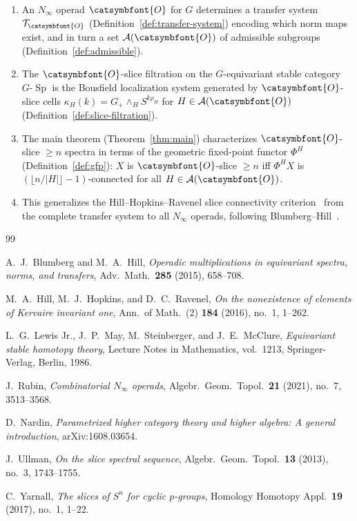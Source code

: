 \documentclass[12pt]{article}
\newcommand{\aO}{{\catsymbfont{O}}}
\newcommand{\aT}{{\mathcal{T}}}
\DeclareMathOperator{\Sp}{Sp}
\newcommand{\SpG}{G\text{-}\Sp}
\theoremstyle{definition}
\begin{document}
\begin{enumerate}
\item An $N_\infty$ operad $\aO$ for $G$ determines a transfer system $\aT_\aO$ (Definition~\ref{def:transfer-system}) encoding which norm maps exist, and in turn a set $\mathcal{A}(\aO)$ of admissible subgroups (Definition~\ref{def:admissible}).

\item The $\aO$-slice filtration on the $G$-equivariant stable category $\SpG$ is the Bousfield localization system generated by $\aO$-slice cells $\kappa_H(k) = G_+\wedge_H S^{k\rho_H}$ for $H\in\mathcal{A}(\aO)$ (Definition~\ref{def:slice-filtration}).

\item The main theorem (Theorem~\ref{thm:main}) characterizes $\aO$-slice $\geq n$ spectra in terms of the geometric fixed-point functor $\Phi^H$ (Definition~\ref{def:gfp}): $X$ is $\aO$-slice $\geq n$ iff $\Phi^H X$ is $(\lfloor n/|H|\rfloor - 1)$-connected for all $H\in\mathcal{A}(\aO)$.

\item This generalizes the Hill--Hopkins--Ravenel slice connectivity criterion~\cite[Prop.~4.28]{HHR} from the complete transfer system to all $N_\infty$ operads, following Blumberg--Hill~\cite{BlumbergHill}.
\end{enumerate}

\begin{thebibliography}{99}

   A.\ J.\ Blumberg and M.\ A.\ Hill,
   \emph{Operadic multiplications in equivariant spectra, norms, and transfers},
   Adv.\ Math.\ \textbf{285} (2015), 658--708.

   M.\ A.\ Hill, M.\ J.\ Hopkins, and D.\ C.\ Ravenel,
   \emph{On the nonexistence of elements of Kervaire invariant one},
   Ann.\ of Math.\ (2) \textbf{184} (2016), no.\ 1, 1--262.

   L.\ G.\ Lewis Jr., J.\ P.\ May, M.\ Steinberger, and J.\ E.\ McClure,
   \emph{Equivariant stable homotopy theory},
   Lecture Notes in Mathematics, vol.\ 1213,
   Springer-Verlag, Berlin, 1986.

   J.\ Rubin,
   \emph{Combinatorial $N_\infty$ operads},
   Algebr.\ Geom.\ Topol.\ \textbf{21} (2021), no.\ 7, 3513--3568.

   D.\ Nardin,
   \emph{Parametrized higher category theory and higher algebra: A general introduction},
   arXiv:1608.03654.

   J.\ Ullman,
   \emph{On the slice spectral sequence},
   Algebr.\ Geom.\ Topol.\ \textbf{13} (2013), no.\ 3, 1743--1755.

   C.\ Yarnall,
   \emph{The slices of $S^n$ for cyclic $p$-groups},
   Homology Homotopy Appl.\ \textbf{19} (2017), no.\ 1, 1--22.

\end{thebibliography}
\end{document}
